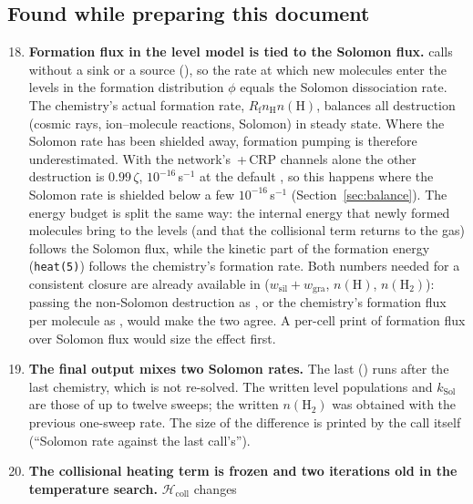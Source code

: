 \subsection{Found while preparing this document}

\begin{enumerate}\setcounter{enumi}{17}
\item \textbf{Formation flux in the level model is tied to the Solomon flux.}
   calls  without a sink or a source
  (), so the rate at which new molecules enter the
  levels in the formation distribution $\phi$ equals the Solomon dissociation
  rate. The chemistry's actual formation rate, $R_{\mathrm f}n_{\mathrm H}n(\mathrm H)$,
  balances all destruction (cosmic rays, ion--molecule reactions, Solomon) in
  steady state. Where the Solomon rate has been shielded away, formation
  pumping is therefore underestimated. With the network's \Htwo\,+\,CRP channels
  alone the other destruction is $0.99\,\zeta$, $10^{-16}$\,s$^{-1}$ at the default
  , so this happens where the Solomon rate is shielded below a few
  $10^{-16}$\,s$^{-1}$ (Section~\ref{sec:balance}). The energy budget is split the same
  way: the internal energy that newly formed molecules bring to the levels
  (and that the collisional term returns to the gas) follows the Solomon flux,
  while the kinetic part of the formation energy (\texttt{heat(5)}) follows the
  chemistry's formation rate. Both numbers needed for a consistent closure are
  already available in  ($w_{\mathrm{sil}}+w_{\mathrm{gra}}$,
  $n(\mathrm H)$, $n(\mathrm{H_2})$): passing the non-Solomon destruction as
  , or the chemistry's formation flux per molecule as , would
  make the two agree. A per-cell print of formation flux over Solomon flux
  would size the effect first.
\item \textbf{The final output mixes two Solomon rates.} The last
   () runs after
  the last chemistry, which is not re-solved. The written level populations and
  $k_{\mathrm{Sol}}$ are those of up to twelve sweeps; the written
  $n(\mathrm{H_2})$ was obtained with the previous one-sweep rate. The size of
  the difference is printed by the call itself (``Solomon rate against the
  last call's'').
\item \textbf{The \Htwo{} collisional heating term is frozen and two
  iterations old in the temperature search.} $\mathcal{H}_{\mathrm{coll}}$ changes

\end{enumerate}
